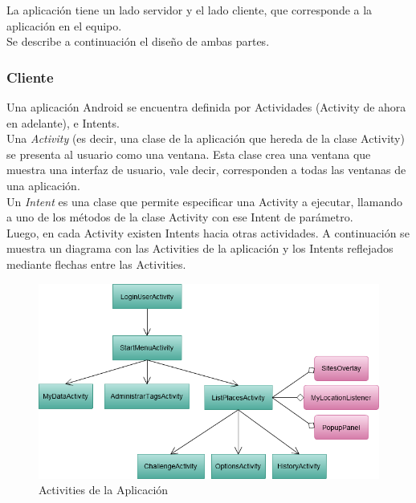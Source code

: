 \documentclass[10pt,letterpaper]{article}
\begin{document}
La aplicación tiene un lado servidor y el lado cliente, que corresponde a la aplicación en el equipo.\\

Se describe a continuación el diseño de ambas partes.

\subsubsection{Cliente}

Una aplicación Android se encuentra definida por Actividades (Activity de ahora en adelante), e Intents.\\

Una \textit{Activity} (es decir, una clase de la aplicación que hereda de la clase Activity) se presenta al usuario como una ventana. Esta clase crea una ventana que muestra una interfaz de usuario, vale decir, corresponden a todas las ventanas de una aplicación. \\

Un \textit{Intent} es una clase que permite especificar una Activity a ejecutar, llamando a uno de los métodos de la clase Activity con ese Intent de parámetro.\\

Luego, en cada Activity existen Intents hacia otras actividades. A continuación se muestra un diagrama con las Activities de la aplicación y los Intents reflejados mediante flechas entre las Activities.\\

\begin{figure}[h]
\begin{center}
\includegraphics[width=400pt]{./imgs/TripdroidActivities.png}
\caption{Activities de la Aplicación}
\end{center}
\end{figure}
\end{document}
